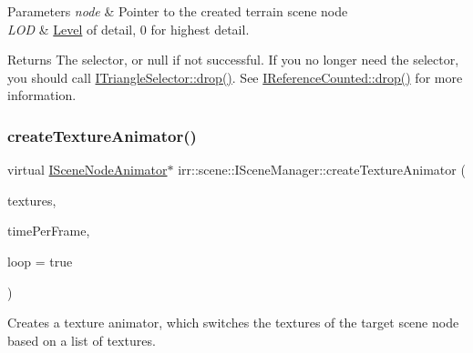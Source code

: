 \begin{DoxyParams}{Parameters}
{\em node} & Pointer to the created terrain scene node \\
\hline
{\em L\+OD} & \hyperlink{classLevel}{Level} of detail, 0 for highest detail. \\
\hline
\end{DoxyParams}
\begin{DoxyReturn}{Returns}
The selector, or null if not successful. If you no longer need the selector, you should call \hyperlink{classirr_1_1IReferenceCounted_a03856a09355b89d178090c4a5f738543}{I\+Triangle\+Selector\+::drop()}. See \hyperlink{classirr_1_1IReferenceCounted_a03856a09355b89d178090c4a5f738543}{I\+Reference\+Counted\+::drop()} for more information. 
\end{DoxyReturn}
\mbox{\label{classirr_1_1scene_1_1ISceneManager_af50f3bdcefe2e7df979b86e297498c29}} 
\subsubsection{\texorpdfstring{create\+Texture\+Animator()}{createTextureAnimator()}\hspace{0.1cm}{\footnotesize\ttfamily [1/2]}}
{\footnotesize\ttfamily virtual \hyperlink{classirr_1_1scene_1_1ISceneNodeAnimator}{I\+Scene\+Node\+Animator}$\ast$ irr\+::scene\+::\+I\+Scene\+Manager\+::create\+Texture\+Animator (\begin{DoxyParamCaption}\item[{const \hyperlink{classirr_1_1core_1_1array}{core\+::array}$<$ \hyperlink{classirr_1_1video_1_1ITexture}{video\+::\+I\+Texture} $\ast$$>$ \&}]{textures,  }\item[{\hyperlink{namespaceirr_ac66849b7a6ed16e30ebede579f9b47c6}{s32}}]{time\+Per\+Frame,  }\item[{bool}]{loop = {\ttfamily true} }\end{DoxyParamCaption})\hspace{0.3cm}{\ttfamily [pure virtual]}}



Creates a texture animator, which switches the textures of the target scene node based on a list of textures. 


